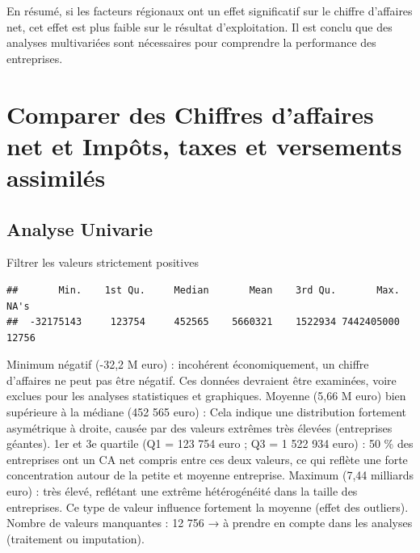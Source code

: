 \documentclass[mstat,12pt]{unswthesis}
\begin{document}
En résumé, si les facteurs régionaux ont un effet significatif sur le
chiffre d'affaires net, cet effet est plus faible sur le résultat
d'exploitation. Il est conclu que des analyses multivariées sont
nécessaires pour comprendre la performance des entreprises.

\newpage

\section{\texorpdfstring{\textbf{Comparer des Chiffres d'affaires net et
Impôts, taxes et versements
assimilés}}{Comparer des Chiffres d'affaires net et Impôts, taxes et versements assimilés}}\label{comparer-des-chiffres-daffaires-net-et-impuxf4ts-taxes-et-versements-assimiluxe9s}

\medskip

\subsection{Analyse Univarie}\label{analyse-univarie-1}

Filtrer les valeurs strictement positives

\medskip

\scriptsize

\begin{verbatim}
##       Min.    1st Qu.     Median       Mean    3rd Qu.       Max.       NA's 
##  -32175143     123754     452565    5660321    1522934 7442405000      12756
\end{verbatim}

\normalsize

\medskip

Minimum négatif (-32,2 M euro) : incohérent économiquement, un chiffre
d'affaires ne peut pas être négatif. Ces données devraient être
examinées, voire exclues pour les analyses statistiques et graphiques.
Moyenne (5,66 M euro) bien supérieure à la médiane (452 565 euro) : Cela
indique une distribution fortement asymétrique à droite, causée par des
valeurs extrêmes très élevées (entreprises géantes). 1er et 3e quartile
(Q1 = 123 754 euro ; Q3 = 1 522 934 euro) : 50 \% des entreprises ont un
CA net compris entre ces deux valeurs, ce qui reflète une forte
concentration autour de la petite et moyenne entreprise. Maximum (7,44
milliards euro) : très élevé, reflétant une extrême hétérogénéité dans
la taille des entreprises. Ce type de valeur influence fortement la
moyenne (effet des outliers). Nombre de valeurs manquantes : 12 756 → à
prendre en compte dans les analyses (traitement ou imputation).
\end{document}
